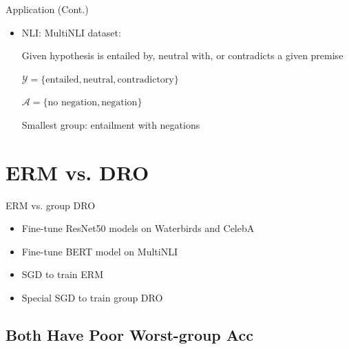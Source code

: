 \documentclass{beamer}
\begin{document}
\begin{viterbiframe}{Application (Cont.)}
\begin{itemize}
    \item NLI: MultiNLI dataset:
    
    Given \alert{hypothesis} is entailed by, neutral with, or contradicts a given \alert{premise}
    
    $\mathcal{Y} = \{\text{entailed}, \text{neutral}, \text{contradictory}\}$
    
    $\mathcal{A} = \{\text{no negation}, \text{negation}\}$
    
    Smallest group: entailment with negations
\end{itemize}
\end{viterbiframe}

\section{ERM vs. DRO}

\begin{viterbiframe}{ERM vs. group DRO}
\begin{itemize}
    \item Fine-tune ResNet50 models on Waterbirds and CelebA

\item Fine-tune BERT model on MultiNLI

\item SGD to train ERM

\item Special SGD to train group DRO

\end{itemize}


\end{viterbiframe}

\subsection{Both Have Poor Worst-group Acc}
\end{document}
